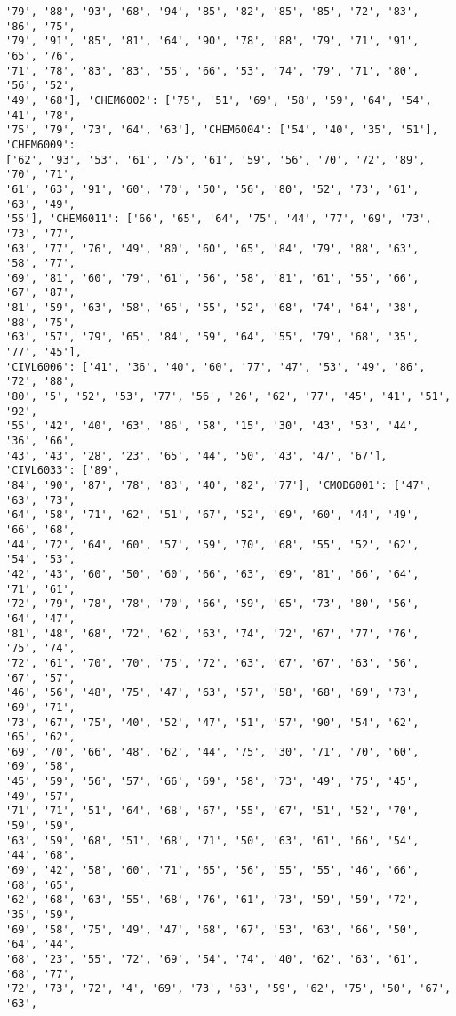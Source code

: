 \documentclass[11pt]{article}
\begin{document}
\begin{Verbatim}[commandchars=\\\{\}]
'79', '88', '93', '68', '94', '85', '82', '85', '85', '72', '83', '86', '75',
'79', '91', '85', '81', '64', '90', '78', '88', '79', '71', '91', '65', '76',
'71', '78', '83', '83', '55', '66', '53', '74', '79', '71', '80', '56', '52',
'49', '68'], 'CHEM6002': ['75', '51', '69', '58', '59', '64', '54', '41', '78',
'75', '79', '73', '64', '63'], 'CHEM6004': ['54', '40', '35', '51'], 'CHEM6009':
['62', '93', '53', '61', '75', '61', '59', '56', '70', '72', '89', '70', '71',
'61', '63', '91', '60', '70', '50', '56', '80', '52', '73', '61', '63', '49',
'55'], 'CHEM6011': ['66', '65', '64', '75', '44', '77', '69', '73', '73', '77',
'63', '77', '76', '49', '80', '60', '65', '84', '79', '88', '63', '58', '77',
'69', '81', '60', '79', '61', '56', '58', '81', '61', '55', '66', '67', '87',
'81', '59', '63', '58', '65', '55', '52', '68', '74', '64', '38', '88', '75',
'63', '57', '79', '65', '84', '59', '64', '55', '79', '68', '35', '77', '45'],
'CIVL6006': ['41', '36', '40', '60', '77', '47', '53', '49', '86', '72', '88',
'80', '5', '52', '53', '77', '56', '26', '62', '77', '45', '41', '51', '92',
'55', '42', '40', '63', '86', '58', '15', '30', '43', '53', '44', '36', '66',
'43', '43', '28', '23', '65', '44', '50', '43', '47', '67'], 'CIVL6033': ['89',
'84', '90', '87', '78', '83', '40', '82', '77'], 'CMOD6001': ['47', '63', '73',
'64', '58', '71', '62', '51', '67', '52', '69', '60', '44', '49', '66', '68',
'44', '72', '64', '60', '57', '59', '70', '68', '55', '52', '62', '54', '53',
'42', '43', '60', '50', '60', '66', '63', '69', '81', '66', '64', '71', '61',
'72', '79', '78', '78', '70', '66', '59', '65', '73', '80', '56', '64', '47',
'81', '48', '68', '72', '62', '63', '74', '72', '67', '77', '76', '75', '74',
'72', '61', '70', '70', '75', '72', '63', '67', '67', '63', '56', '67', '57',
'46', '56', '48', '75', '47', '63', '57', '58', '68', '69', '73', '69', '71',
'73', '67', '75', '40', '52', '47', '51', '57', '90', '54', '62', '65', '62',
'69', '70', '66', '48', '62', '44', '75', '30', '71', '70', '60', '69', '58',
'45', '59', '56', '57', '66', '69', '58', '73', '49', '75', '45', '49', '57',
'71', '71', '51', '64', '68', '67', '55', '67', '51', '52', '70', '59', '59',
'63', '59', '68', '51', '68', '71', '50', '63', '61', '66', '54', '44', '68',
'69', '42', '58', '60', '71', '65', '56', '55', '55', '46', '66', '68', '65',
'62', '68', '63', '55', '68', '76', '61', '73', '59', '59', '72', '35', '59',
'69', '58', '75', '49', '47', '68', '67', '53', '63', '66', '50', '64', '44',
'68', '23', '55', '72', '69', '54', '74', '40', '62', '63', '61', '68', '77',
'72', '73', '72', '4', '69', '73', '63', '59', '62', '75', '50', '67', '63',

\end{Verbatim}
\end{document}
